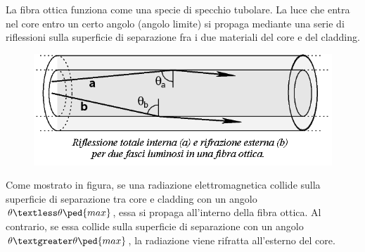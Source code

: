 \documentclass[a4paper,11pt]{article}
\begin{document}
La fibra ottica funziona come una specie di specchio tubolare. La luce che entra nel core entro un certo angolo (angolo limite) si propaga mediante una serie di riflessioni sulla superficie di separazione fra i due materiali del core e del cladding.

 \begin{center} 
\begin{figure}[htpd]
\hspace{90 pt}
\includegraphics[scale=0.90]{Fibra_ottica2.png}


\end{figure}
\end{center}

Come mostrato in figura, se una radiazione elettromagnetica collide sulla superficie di separazione tra core e cladding con un angolo $\theta \textless \theta \ped{max}$, essa si propaga all'interno della fibra ottica. Al contrario, se essa 
collide sulla superficie di separazione con un angolo $\theta \textgreater \theta \ped{max}$, la radiazione viene rifratta all'esterno del core. 
\end{document}
